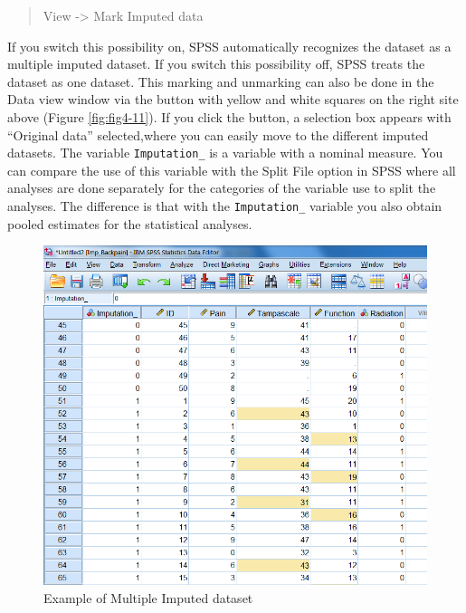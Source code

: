 \documentclass[]{book}
\begin{document}
\begin{quote}
View -\textgreater{} Mark Imputed data
\end{quote}

If you switch this possibility on, SPSS automatically recognizes the
dataset as a multiple imputed dataset. If you switch this possibility
off, SPSS treats the dataset as one dataset. This marking and unmarking
can also be done in the Data view window via the button with yellow and
white squares on the right site above (Figure \ref{fig:fig4-11}). If you
click the button, a selection box appears with ``Original data''
selected,where you can easily move to the different imputed datasets.
The variable \texttt{Imputation\_} is a variable with a nominal measure.
You can compare the use of this variable with the Split File option in
SPSS where all analyses are done separately for the categories of the
variable use to split the analyses. The difference is that with the
\texttt{Imputation\_} variable you also obtain pooled estimates for the
statistical analyses.

\begin{figure}

{\centering \includegraphics[width=0.9\linewidth]{images/fig4.10} 

}

\caption{Example of Multiple Imputed dataset}\label{fig:fig4-10}
\end{figure}
\end{document}
